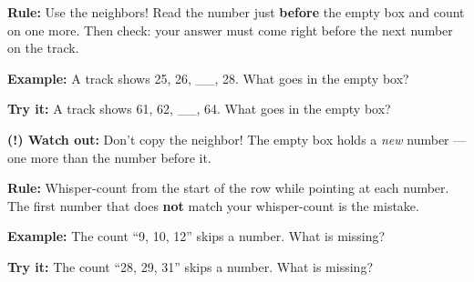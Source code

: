 \documentclass[12pt]{article}
\begin{document}


\begin{formulabox}
\textbf{Rule:} Use the neighbors! Read the number just \textbf{before} the
empty box and count on one more. Then check: your answer must come right
before the next number on the track.
\end{formulabox}

\begin{examplebox}
\textbf{Example:} \quad A track shows 25, 26, \_\_, 28. What goes in the empty
box?
\end{examplebox}

\begin{tryitbox}
\textbf{Try it:} \quad A track shows 61, 62, \_\_, 64. What goes in the empty
box?\\[2pt]
\end{tryitbox}

\begin{watchoutbox}
\textbf{(!) Watch out:} Don't copy the neighbor! The empty box holds a
\emph{new} number --- one more than the number before it.
\end{watchoutbox}


\begin{formulabox}
\textbf{Rule:} Whisper-count from the start of the row while pointing at each
number. The first number that does \textbf{not} match your whisper-count is
the mistake.
\end{formulabox}

\begin{examplebox}
\textbf{Example:} \quad The count ``9, 10, 12'' skips a number. What is
missing?
\end{examplebox}

\begin{tryitbox}
\textbf{Try it:} \quad The count ``28, 29, 31'' skips a number. What is
missing?\\[2pt]
\end{tryitbox}
\end{document}
